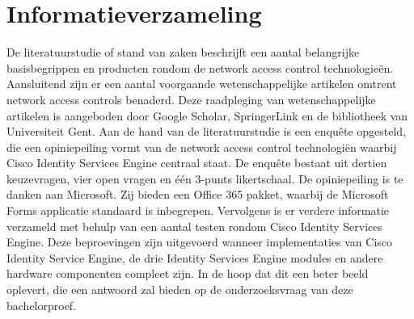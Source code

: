 \section{Informatieverzameling}
De literatuurstudie of stand van zaken beschrijft een aantal belangrijke basisbegrippen en producten rondom de network access control technologieën. Aansluitend zijn er een aantal voorgaande wetenschappelijke artikelen omtrent network access controls benaderd. Deze raadpleging van wetenschappelijke artikelen is aangeboden door Google Scholar, SpringerLink en de bibliotheek van Universiteit Gent.
\newline
\newline
Aan de hand van de literatuurstudie is een enquête opgesteld, die een opiniepeiling vormt van de network access control technologiën waarbij Cisco Identity Services Engine centraal staat. De enquête bestaat uit dertien keuzevragen, vier open vragen en één 3-punts likertschaal. De opiniepeiling is te danken aan Microsoft. Zij bieden een Office 365 pakket, waarbij de Microsoft Forms applicatie standaard is inbegrepen. \newline \newline
Vervolgens is er verdere informatie verzameld met behulp van een aantal testen rondom Cisco Identity Services Engine. Deze beproevingen zijn uitgevoerd wanneer implementaties van Cisco Identity Service Engine, de drie Identity Services Engine modules en andere hardware componenten compleet zijn. In de hoop dat dit een beter beeld oplevert, die een antwoord zal bieden op de onderzoeksvraag van deze bachelorproef. 

